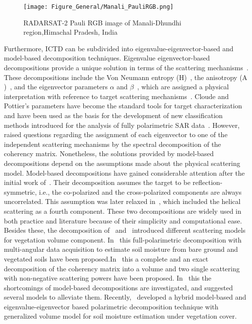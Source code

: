 \begin{figure}[!ht]
	\centering
	\texttt{[image: Figure\_General/Manali\_PauliRGB.png]} 
	\caption{RADARSAT-2 Pauli RGB image of Manali-Dhundhi region,Himachal Pradesh, India}
	\label{fig:Pauli_RGB_Chennai}
\end{figure}

Furthermore, ICTD can be subdivided into eigenvalue-eigenvector-based and model-based decomposition techniques. Eigenvalue eigenvector-based decompositions provide a unique solution in terms of the scattering mechanisms~\citep{Cloude96,TOUZI2007}. These decompositions include the Von Neumann entropy ($\mbox{H}$)~\citep{john1955mathematical,cloude1986group}, the anisotropy ($\mbox{A}$)~\citep{CLOUDE97}, and the eigenvector parameters $\alpha$ and $\beta$~\citep{Cloude96,CLOUDE97}, which are assigned a physical interpretation with reference to target scattering mechanisms~\citep{cloude1986group,van1992bayesian,CLOUDE97,Cloude96}. Cloude and Pottier’s parameters have become the standard tools for target characterization and have been used as the basis for the development of new classification methods introduced for the analysis of fully polarimetric SAR data~\citep{lee1999polarimetric,pottier2000unsupervised,ferro2001unsupervised}. However,~\citep{alvarez2011coherence} raised questions regarding the assignment of each eigenvector to one of the independent scattering mechanisms by the spectral decomposition of the coherency matrix. Nonetheless, the solutions provided by model-based decompositions depend on the assumptions made about the physical scattering model. Model-based decompositions have gained considerable attention after the initial work of~\citep{freeman98}. Their decomposition assumes the target to be reflection-symmetric, i.e., the co-polarized and the cross-polarized components are always uncorrelated. This assumption was later relaxed in~\citep{Yamaguchi2005}, which included the helical scattering as a fourth component. These two decompositions are widely used in both practice and literature because of their simplicity and computational ease. Besides these, the decomposition of~\citep{arii2010general,arii2011adaptive} and~\citep{neumann2010estimation} introduced different scattering models for vegetation volume component. In~\citep{jagdhuber2013soil} this full-polarimetric decomposition with multi-angular data acquisition to estimate soil moisture from bare ground and vegetated soils have been proposed.In~\citep{cui2014complete} this a complete and an exact decomposition of the coherency matrix into a volume and two single scattering with non-negative scattering powers have been proposed. In~\citep{lee2014generalized} this the shortcomings of model-based decompositions are investigated, and suggested several models to alleviate them. Recently,~\citep{jagdhuber2014iterative} developed a hybrid model-based and eigenvalue-eigenvector based polarimetric decomposition technique with generalized volume model for soil moisture estimation under vegetation cover. 

